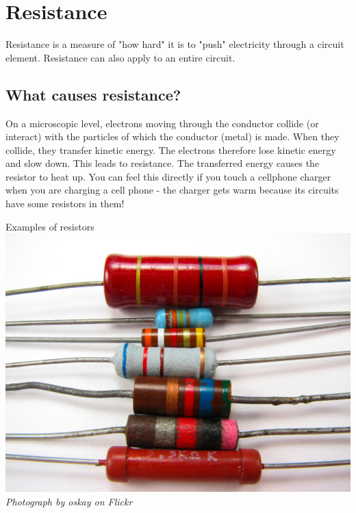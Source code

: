 \section{Resistance}

Resistance is a measure of "how hard" it is to "push" electricity through a circuit element. Resistance can also apply to an entire circuit.

\subsection*{What causes resistance?}

\begin{minipage}{.5\textwidth}
On a microscopic level, electrons moving through
the conductor collide (or interact) with the particles of which the conductor
(metal) is made. When they collide, they transfer kinetic energy. 
The electrons therefore lose kinetic energy and slow down. This leads to
resistance. The transferred energy causes the resistor to heat up.
You can feel this directly if you touch a cellphone charger when you are charging a cell phone - the charger gets warm because its circuits have some resistors in them!
\end{minipage}
\begin{minipage}{.5\textwidth}
\begin{center}
 Examples of resistors\\
\includegraphics[width=.8\textwidth]{photos/resistors_oskay.jpg}\\
\textit{Photograph by oskay on Flickr}
\end{center}
\end{minipage}

